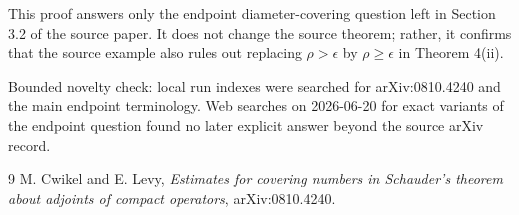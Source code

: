 \documentclass[11pt]{article}
\begin{document}
This proof answers only the endpoint diameter-covering question left in
Section 3.2 of the source paper. It does not change the source theorem; rather,
it confirms that the source example also rules out replacing \(\rho>\epsilon\)
by \(\rho\ge\epsilon\) in Theorem 4(ii).

Bounded novelty check: local run indexes were searched for arXiv:0810.4240 and
the main endpoint terminology. Web searches on 2026-06-20 for exact variants
of the endpoint question found no later explicit answer beyond the source
arXiv record.

\begin{thebibliography}{9}
M. Cwikel and E. Levy,
\emph{Estimates for covering numbers in Schauder's theorem about adjoints of
compact operators},
arXiv:0810.4240.
\end{thebibliography}
\end{document}
